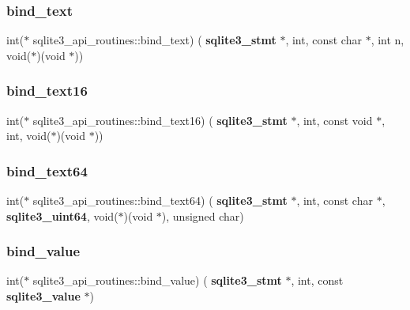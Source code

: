 \mbox{\label{structsqlite3__api__routines_a0b489499ca3b7e212d25ea8a86d38f0e}} 
\subsubsection{bind\_text}
{\footnotesize\ttfamily int($\ast$ sqlite3\+\_\+api\+\_\+routines\+::bind\+\_\+text) (\textbf{ sqlite3\+\_\+stmt} $\ast$, int, const char $\ast$, int n, void($\ast$)(void $\ast$))}

\mbox{\label{structsqlite3__api__routines_ab6ad28704caf8337cf5a395154e8941c}} 
\subsubsection{bind\_text16}
{\footnotesize\ttfamily int($\ast$ sqlite3\+\_\+api\+\_\+routines\+::bind\+\_\+text16) (\textbf{ sqlite3\+\_\+stmt} $\ast$, int, const void $\ast$, int, void($\ast$)(void $\ast$))}

\mbox{\label{structsqlite3__api__routines_aab0cca7b94c71fa0e335cdbb17820ab5}} 
\subsubsection{bind\_text64}
{\footnotesize\ttfamily int($\ast$ sqlite3\+\_\+api\+\_\+routines\+::bind\+\_\+text64) (\textbf{ sqlite3\+\_\+stmt} $\ast$, int, const char $\ast$, \textbf{ sqlite3\+\_\+uint64}, void($\ast$)(void $\ast$), unsigned char)}

\mbox{\label{structsqlite3__api__routines_a8f3424b59d6bbc836c233a44a2fd9a36}} 
\subsubsection{bind\_value}
{\footnotesize\ttfamily int($\ast$ sqlite3\+\_\+api\+\_\+routines\+::bind\+\_\+value) (\textbf{ sqlite3\+\_\+stmt} $\ast$, int, const \textbf{ sqlite3\+\_\+value} $\ast$)}

